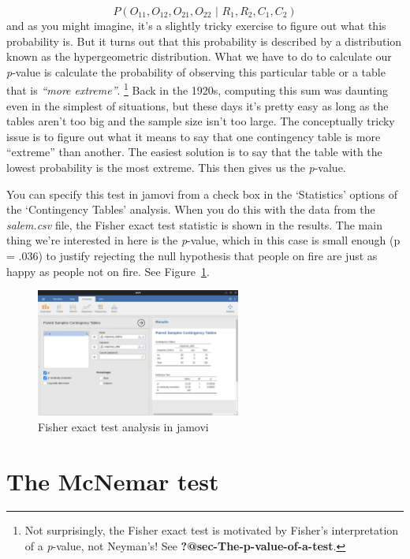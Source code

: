 \documentclass[
  a4paper,
]{book}
\begin{document}
\[P(O_{11}, O_{12}, O_{21}, O_{22}  \text{ | } R_1, R_2, C_1, C_2)\] and
as you might imagine, it's a slightly tricky exercise to figure out what
this probability is. But it turns out that this probability is described
by a distribution known as the hypergeometric distribution. What we have
to do to calculate our \emph{p}-value is calculate the probability of
observing this particular table or a table that is \emph{``more
extreme''}. \footnote{Not surprisingly, the Fisher exact test is
  motivated by Fisher's interpretation of a \emph{p}-value, not
  Neyman's! See \textbf{?@sec-The-p-value-of-a-test}.} Back in the
1920s, computing this sum was daunting even in the simplest of
situations, but these days it's pretty easy as long as the tables aren't
too big and the sample size isn't too large. The conceptually tricky
issue is to figure out what it means to say that one contingency table
is more ``extreme'' than another. The easiest solution is to say that
the table with the lowest probability is the most extreme. This then
gives us the \emph{p}-value.

You can specify this test in jamovi from a check box in the `Statistics'
options of the `Contingency Tables' analysis. When you do this with the
data from the \emph{salem.csv} file, the Fisher exact test statistic is
shown in the results. The main thing we're interested in here is the
\emph{p}-value, which in this case is small enough (p = .036) to justify
rejecting the null hypothesis that people on fire are just as happy as
people not on fire. See Figure~\ref{fig-fig10-7}.

\begin{figure}

\includegraphics[width=0.6\textwidth,height=\textheight]{images/fig10-7.png} \hfill{}

\caption{\label{fig-fig10-7}Fisher exact test analysis in jamovi}

\end{figure}

\hypertarget{sec-The-McNemar-test}{%
\section{The McNemar test}\label{sec-The-McNemar-test}}
\end{document}
